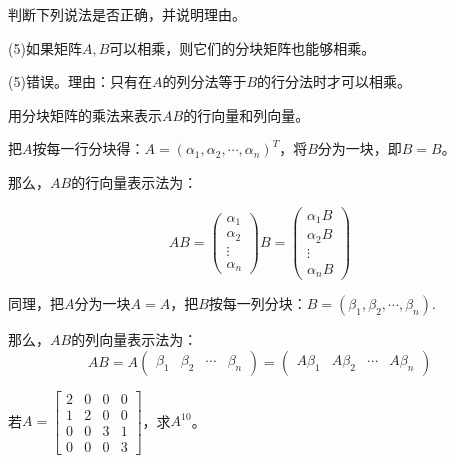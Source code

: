 \documentclass[a4paper]{report}
\begin{document}
\EX 判断下列说法是否正确，并说明理由。

(5)如果矩阵$A,B$可以相乘，则它们的分块矩阵也能够相乘。

\begin{jie}
(5)错误。理由：只有在$A$的列分法等于$B$的行分法时才可以相乘。
\end{jie}

\EX 用分块矩阵的乘法来表示$AB$的行向量和列向量。

\begin{jie}
把$A$按每一行分块得：$A=(\alpha_1,\alpha_2,\cdots,\alpha_n)^T$，将$B$分为一块，即$B=B$。

那么，$AB$的行向量表示法为：

\begin{equation*}
  AB=
  \begin{pmatrix}
    \alpha_1\\ \alpha_2\\ \vdots\\ \alpha_n
  \end{pmatrix}B=
  \begin{pmatrix}
    \alpha_1B\\ \alpha_2B\\ \vdots\\ \alpha_nB
  \end{pmatrix}
\end{equation*}

同理，把$A$分为一块$A=A$，把$B$按每一列分块：$B=(\beta_1,\beta_2,\cdots,\beta_n)$.

那么，$AB$的列向量表示法为：
\begin{equation*}
  AB=
  A\begin{pmatrix}
    \beta_1&\beta_2&\cdots&\beta_n
  \end{pmatrix}=
  \begin{pmatrix}
    A\beta_1&A\beta_2&\cdots&A\beta_n
  \end{pmatrix}
\end{equation*}
\end{jie}

\EX 若$
A=
\begin{bmatrix}
2&0&0&0\\
1&2&0&0\\
0&0&3&1\\
0&0&0&3
\end{bmatrix}
$，求$A^{10}$。
\end{document}
